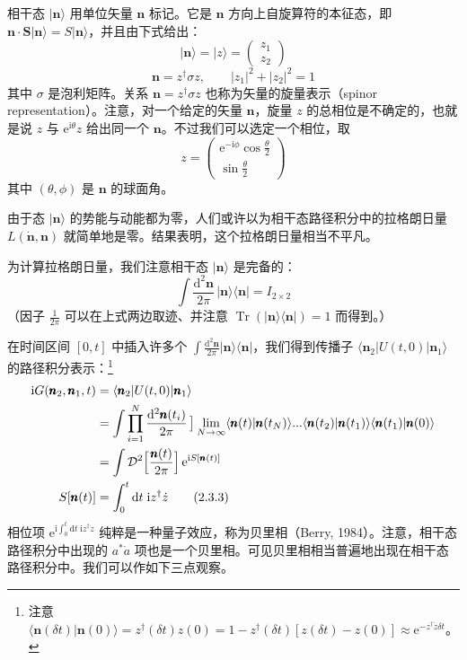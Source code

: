 相干态 $|\pmb{n}\rangle$ 用单位矢量 $\pmb{n}$ 标记。它是 $\pmb{n}$ 方向上自旋算符的本征态，即 $\pmb{n}\cdot\pmb{S}|\pmb{n}\rangle = S|\pmb{n}\rangle$，并且由下式给出：
\begin{equation*}
|\pmb{n}\rangle = |z\rangle = \begin{pmatrix} z_1 \\ z_2 \end{pmatrix}
\end{equation*}
\begin{equation*}
\pmb{n} = z^{\dagger}\sigma z, \qquad |z_1|^2 + |z_2|^2 = 1
\end{equation*}
其中 $\sigma$ 是泡利矩阵。关系 $\pmb{n} = z^{\dagger}\sigma z$ 也称为矢量的旋量表示（spinor representation）。注意，对一个给定的矢量 $\pmb{n}$，旋量 $z$ 的总相位是不确定的，也就是说 $z$ 与 $\mathrm{e}^{\mathrm{i}\theta}z$ 给出同一个 $\pmb{n}$。不过我们可以选定一个相位，取
\begin{equation*}
z = \begin{pmatrix} \mathrm{e}^{-\mathrm{i}\phi}\cos\frac{\theta}{2} \\[0.5ex] \sin\frac{\theta}{2} \end{pmatrix} \tag{2.3.1}
\end{equation*}
其中 $(\theta, \phi)$ 是 $\pmb{n}$ 的球面角。

由于态 $|\pmb{n}\rangle$ 的势能与动能都为零，人们或许以为相干态路径积分中的拉格朗日量 $L(\dot{\pmb{n}}, \pmb{n})$ 就简单地是零。结果表明，这个拉格朗日量相当不平凡。

为计算拉格朗日量，我们注意相干态 $|\pmb{n}\rangle$ 是完备的：
\begin{equation*}
\int \frac{\mathrm{d}^2\pmb{n}}{2\pi}\, |\pmb{n}\rangle\langle\pmb{n}| = I_{2\times 2} \tag{2.3.2}
\end{equation*}
（因子 $\frac{1}{2\pi}$ 可以在上式两边取迹、并注意 $\operatorname{Tr}(|\pmb{n}\rangle\langle\pmb{n}|) = 1$ 而得到。）

在时间区间 $[0, t]$ 中插入许多个 $\int \frac{\mathrm{d}^2\pmb{n}}{2\pi}|\pmb{n}\rangle\langle\pmb{n}|$，我们得到传播子 $\langle\pmb{n}_2|U(t,0)|\pmb{n}_1\rangle$ 的路径积分表示：\footnote{注意 $\langle\pmb{n}(\delta t)|\pmb{n}(0)\rangle = z^{\dagger}(\delta t)z(0) = 1 - z^{\dagger}(\delta t)[z(\delta t) - z(0)] \approx \mathrm{e}^{-z^{\dagger}\dot{z}\delta t}$。}
\begin{align*}
\mathrm{i}G(\pmb{n}_2, \pmb{n}_1, t) &= \langle\pmb{n}_2|U(t,0)|\pmb{n}_1\rangle
\\
&= \int \prod_{i=1}^{N} \frac{\mathrm{d}^2\pmb{n}(t_i)}{2\pi}\, \bigr]\lim_{N \to \infty} \langle\pmb{n}(t)|\pmb{n}(t_N)\rangle...\langle\pmb{n}(t_2)|\pmb{n}(t_1)\rangle\langle\pmb{n}(t_1)|\pmb{n}(0)\rangle
\\
&= \int \mathcal{D}^2\Bigl[\frac{\pmb{n}(t)}{2\pi}\Bigr]\, \mathrm{e}^{\mathrm{i}S[\pmb{n}(t)]}
\\
S[\pmb{n}(t)] &= \int_0^t \mathrm{d}t\; \mathrm{i}z^{\dagger}\dot{z} \tag{2.3.3}
\end{align*}
相位项 $\mathrm{e}^{\mathrm{i}\int_0^t \mathrm{d}t\; \mathrm{i}z^{\dagger}\dot{z}}$ 纯粹是一种量子效应，称为贝里相（Berry, 1984）。注意，相干态路径积分中出现的 $a^{*}\dot{a}$ 项也是一个贝里相。可见贝里相相当普遍地出现在相干态路径积分中。我们可以作如下三点观察。

